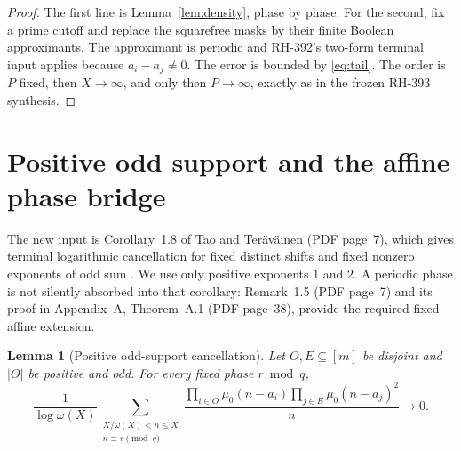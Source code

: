 \documentclass[11pt]{article}
\newtheorem{lemma}[theorem]{Lemma}
\theoremstyle{definition}
\theoremstyle{remark}
\newcommand{\mob}{\mu}
\begin{document}
\begin{proof}
The first line is Lemma~\ref{lem:density}, phase by phase.  For the second,
fix a prime cutoff and replace the squarefree masks by their finite Boolean
approximants.  The approximant is periodic and RH-392's two-form terminal
input applies because \(a_i-a_j\neq0\).  The error is bounded by
\eqref{eq:tail}.  The order is \(P\) fixed, then \(X\to\infty\), and only
then \(P\to\infty\), exactly as in the frozen RH-393 synthesis.
\end{proof}

\section{Positive odd support and the affine phase bridge}

The new input is Corollary~1.8 of Tao and Ter\"av\"ainen (PDF page~7),
which gives terminal logarithmic cancellation for fixed distinct shifts
and fixed nonzero exponents of odd sum \cite{TaoTeravainen2019}.  We use
only positive exponents \(1\) and \(2\).  A periodic phase is not silently
absorbed into that corollary: Remark~1.5 (PDF page~7) and its proof in
Appendix~A, Theorem~A.1 (PDF page~38), provide the required fixed affine
extension.

\begin{lemma}[Positive odd-support cancellation]
\label{lem:odd}
Let \(O,E\subseteq[m]\) be disjoint and \(|O|\) be positive and odd.  For
every fixed phase \(r\bmod q\),
\begin{equation}
 \frac1{\log\omega(X)}
 \sum_{\substack{X/\omega(X)<n\leq X\\n\equiv r\pmod q}}
 \frac{\prod_{i\in O}\mob_0(n-a_i)
 \prod_{j\in E}\mob_0(n-a_j)^2}{n}\longrightarrow0.
 \label{eq:odd-channel}
\end{equation}
\end{lemma}
\end{document}
